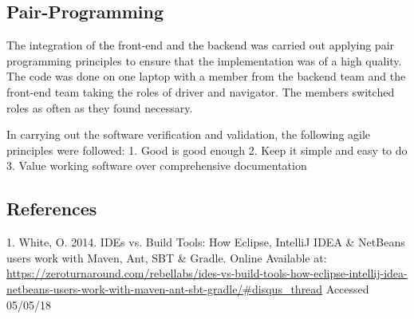 \documentclass[a4paper,12pt]{report}
\begin{document}
\subsection{Pair-Programming}
The integration of the front-end and the backend was carried out applying pair programming principles to ensure that the implementation was of a high quality. The code was done on one laptop with a member from the backend team and the front-end team taking the roles of driver and navigator. The members switched roles as often as they found necessary.

In carrying out the software verification and validation, the following agile principles were followed:   			
1. Good is good enough
2. Keep it simple and easy to do
3. Value working software over comprehensive documentation
\\
\subsection{References}

1.	White, O. 2014. IDEs vs. Build Tools: How Eclipse, IntelliJ IDEA \& NetBeans users work with Maven, Ant, SBT \& Gradle. Online Available at:
\url{https://zeroturnaround.com/rebellabs/ides-vs-build-tools-how-eclipse-intellij-idea-netbeans-users-work-with-maven-ant-sbt-gradle/#disqus_thread}
Accessed 05/05/18\\
\end{document}
